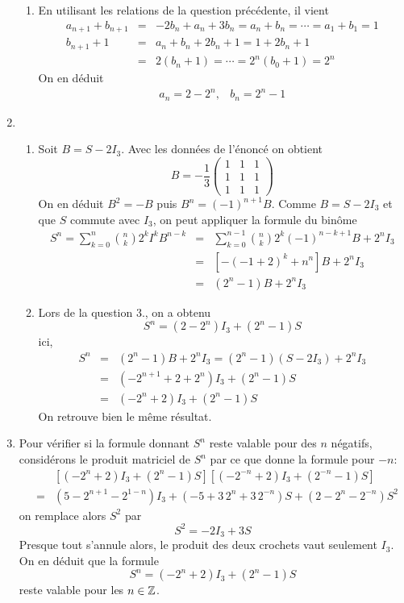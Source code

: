 \begin{enumerate}
\begin{enumerate}
\item En utilisant les relations de la question précédente, il vient
\begin{eqnarray*}
a_{n+1}+b_{n+1}&=&-2b_n+a_n+3b_n=a_n+b_n=\cdots=a_1+b_1=1 \\
b_{n+1}+1 &=& a_n+b_n+2b_n+1=1+2b_n+1\\
         &=& 2(b_n+1)=\cdots=2^{n}(b_0+1)=2^n
\end{eqnarray*}
On en déduit
\begin{eqnarray*}
 a_n=2-2^n,& b_n=2^n-1
\end{eqnarray*}
\end{enumerate}
\item \begin{enumerate}
 \item Soit $B=S-2I_3$. Avec les données de l'énoncé on obtient
\[
B=-\frac{1}{3}\left( \begin{array}{ccc}
1 & 1 & 1 \\
1 & 1 & 1 \\
1 & 1 & 1 
                       \end{array}\right) \]
On en déduit $B^2=-B$ puis $B^{n}=(-1)^{n+1}B$.\newline
Comme $B=S-2I_3$ et que $S$ commute avec $I_3$, on peut appliquer la formule du binôme
\begin{eqnarray*}
 S^n=\sum_{k=0}^{n}\binom{n}{k}2^kI^kB^{n-k} &=&
  \sum_{k=0}^{n-1}\binom{n}{k}2^k(-1)^{n-k+1}B+2^nI_3\\
&=&\left[ -(-1+2)^k+n^n\right]B+2^nI_3 \\
&=&(2^n-1)B+2^nI_3
\end{eqnarray*}
\item Lors de la question 3., on a obtenu
\[S^n=(2-2^n)I_3+(2^n-1)S\]
ici,
\begin{eqnarray*}
 S^n &=& (2^n-1)B+2^nI_3=(2^n-1)(S-2I_3)+2^nI_3\\
&=&(-2^{n+1}+2+2^n)I_3+(2^n-1)S\\
&=&(-2^n+2)I_3+(2^n-1)S
\end{eqnarray*}
On retrouve bien le même résultat.
\end{enumerate}
\item Pour vérifier si la formule donnant $S^n$ reste valable pour des $n$ négatifs, considérons le produit matriciel de $S^n$ par ce que donne la formule pour $-n$:
\begin{eqnarray*}
& & \left[ (-2^n+2)I_3 + (2^n-1)S\right] \left[ (-2^{-n}+2)I_3+(2^{-n}-1)S\right]\\
&=& (5-2^{n+1}-2^{1-n})I_3+(-5+3\,2^{n}+3\,2^{-n})S+(2-2^n-2^{-n})S^2
\end{eqnarray*}
on remplace alors $S^2$ par
\[S^2=-2I_3+3S\]
Presque tout s'annule alors, le produit des deux crochets vaut seulement $I_3$. On en déduit que la formule
\[S^n=(-2^n+2)I_3+(2^n-1)S\]
reste valable pour les $n\in \mathbb{Z}$. 
\end{enumerate}
